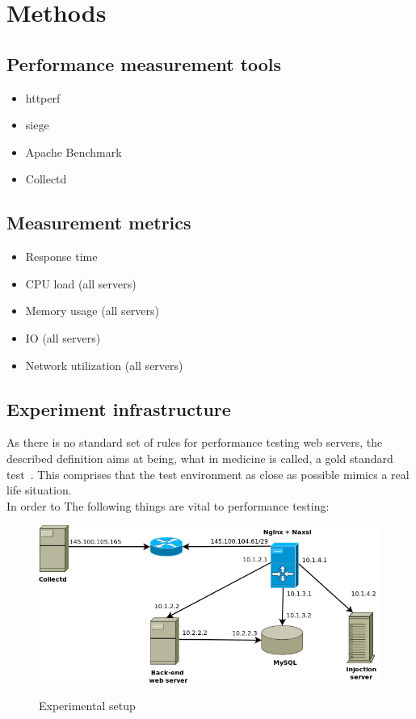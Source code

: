 \documentclass[Methods]{subfiles}
\begin{document}
\section{Methods}
\label{sec:Methods}

\subsection{Performance measurement tools}
\begin{itemize}
\item httperf
\item siege
\item Apache Benchmark
\item Collectd
\end{itemize}

\subsection{Measurement metrics}
\begin{itemize}
\item Response time
\item CPU load (all servers)
\item Memory usage (all servers)
\item IO (all servers)
\item Network utilization (all servers)
\end{itemize}

\subsection{Experiment infrastructure}
As there is no standard set of rules for performance testing web servers, the described definition aims at being, what in medicine is called, a gold standard test~\cite{wacholder1993validation}. This comprises that the test environment as close as possible mimics a real life situation. \\ 
In order to The following things are vital to performance testing:

\begin{figure}[h]
\caption{Experimental setup}
\centering
\includegraphics[scale=0.4] {images/infrastructure.png}
\label{fig:Experimental setup}
\end{figure}
\end{document}
